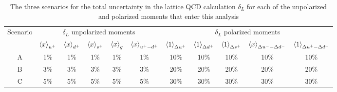 \begin{table}[h]
  \centering
  \small
  \begin{tabular}{c||ccccc||ccccc}
    \hline
    Scenario &  \multicolumn{5}{c||}{$\delta_L$ unpolarized moments}    &
    \multicolumn{5}{c}{$\delta_L$ polarized moments} \\
&    $\left\langle x\right\rangle_{u^+}$  &   $\left\langle x\right\rangle_{d^+}$   &  $\left\langle x\right\rangle_{s^+}$  &
$\left\langle x\right\rangle_{g}$  &   $\left\langle x\right\rangle_{u^+-d^+}$  &
$\left\langle 1\right\rangle_{\Delta u^+}$  & $\left\langle 1\right\rangle_{\Delta d^+}$  & $\left\langle 1\right\rangle_{\Delta s^+}$
&  $\left\langle x\right\rangle_{\Delta u^--\Delta d^-}$  &  $\left\langle 1\right\rangle_{\Delta u^+ - \Delta d^+}$\\
    \hline
    A   & 1\%  & 1\% &  1\% &  1\% &  1\% &
    10\% &    10\%  &   10\% &    10\%  &    10\% \\
 B   & 3\%  & 3\% &  3\% &  3\% &  3\% &
 20\% &    20\%  &   20\% &    20\%  &    20\% \\
  C   & 5\%  & 5\% &  5\% &  5\% &  5\% &
    30\% &    30\%  &   30\% &    30\%  &    30\% \\
    \hline
  \end{tabular}
  \caption{\small The three scenarios for the total uncertainty
    in the lattice QCD calculation $\delta_L$ for each
    of the unpolarized and polarized moments that enter
    this analysis
\label{tab:scenarios}
  }
\end{table}


